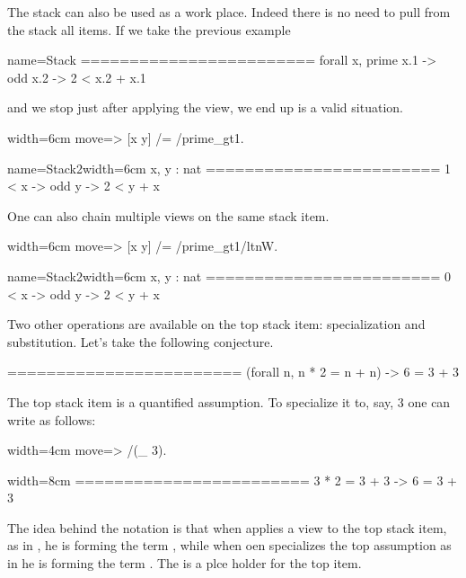 


The stack can also be used as a work place.  Indeed there is
no need to pull from the stack all items.  If we take the previous example

\begin{coqout}{name=Stack}{}
========================
forall x, prime x.1 -> odd x.2 -> 2 < x.2 + x.1
\end{coqout}
and we stop just after applying the view, we end up is a valid situation.

\begin{coq}{}{width=6cm}
move=> [x y] /= /prime_gt1.
\end{coq}
\begin{coqout}{name=Stack2}{width=6cm}
 x, y : nat
 ========================
 1 < x -> odd y -> 2 < y + x
\end{coqout}

One can also chain multiple views on the same stack item.

\begin{coq}{}{width=6cm}
move=> [x y] /= /prime_gt1/ltnW.
\end{coq}
\begin{coqout}{name=Stack2}{width=6cm}
 x, y : nat
 ========================
 0 < x -> odd y -> 2 < y + x
\end{coqout}

Two other operations are available on the top stack item: specialization
and substitution.  Let's take the following conjecture.

\begin{coqout}{}{}
========================
(forall n, n * 2 = n + n) -> 6 = 3 + 3
\end{coqout}

The top stack item is a quantified assumption.  To specialize it to, say,
3 one can write as follows:

\begin{coq}{}{width=4cm}
move=> /(_ 3).
\end{coq}
\begin{coqout}{}{width=8cm}
========================
3 * 2 = 3 + 3 -> 6 = 3 + 3
\end{coqout}
The idea behind the notation is that when applies a view to the top
stack item, as in , he is forming the term , while
when oen specializes the top assumption as in  he is forming the
term .  The \C{_} is a plce holder for the top item.

